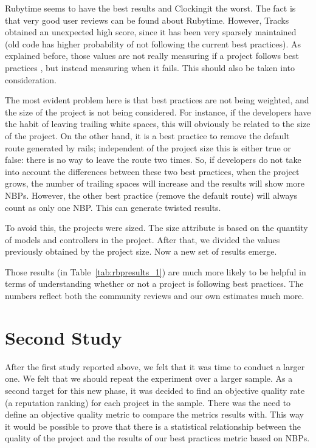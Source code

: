 

Rubytime seems to have the best results and Clockingit the worst. 
The fact is that very good user reviews can be found about Rubytime.
However, Tracks obtained an unexpected high score, since it has been very sparsely maintained 
(old code has higher probability of not following the current best practices).
As explained before, those values are not really measuring if a project follows best practices ,
but instead measuring when it fails.
This should also be taken into consideration. 

The most evident problem here is that best practices are not being weighted, and the size of the project is not being considered.
For instance, if the developers have the habit of leaving trailing white spaces, this will obviously be related to the size of the project.
On the other hand, it is a best practice to remove the default route generated by rails; 
independent of the project size this is either true or false: there is no way to leave the route two times. 
So, if developers do not take into account the differences between these two best practices, when the project grows, 
the number of trailing spaces will increase and the results will show more NBPs. 
However, the other best practice (remove the default route) will always count as only one NBP.  
This can generate twisted results.

To avoid this, the projects were sized.
The size attribute is based on the quantity of models and controllers in the project.
After that, we divided the values previously obtained  by the project size.
Now a new set of results emerge.



Those results (in Table~\ref{tab:rbpresults_1}) are much more likely to be helpful in terms of understanding whether or not a project is following 
best practices.
The numbers reflect both the community reviews and our own estimates much more.



\section{Second Study}\label{subsec:second_study}
After the first study reported above, we felt that it was time to conduct a larger one.
We felt that we should repeat the experiment over a larger sample. 
As a second target for this new phase, it was decided to find an objective quality rate (a reputation ranking) 
for each project in the sample.
There was the need to define an objective quality metric to compare the metrics results with.
This way it would be possible to prove that there is a statistical relationship between the quality of the project
and the results of our best practices metric based on NBPs.

